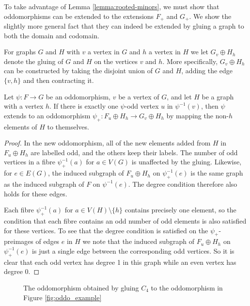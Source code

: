 \documentclass[11pt]{article}
\begin{document}
To take advantage of Lemma \ref{lemma:rooted-minors}, we must show that oddomorphisms can be extended to the extensions $F_+$ and $G_+$.
We show the slightly more general fact that they can indeed be extended by gluing a graph to both the domain and codomain.\par 
For graphs $G$ and $H$ with $v$ a vertex in $G$ and $h$ a vertex in $H$ we let $G_v \oplus H_h$ denote the gluing of $G$ and $H$ on the vertices $v$ and $h$. More specifically, $G_v \oplus H_h$ can be constructed by taking the disjoint union of $G$ and $H$, adding the edge $\{v,h\}$ and then contracting it.

\begin{lemma}
\label{lemma:oddo_extension}
    Let $\psi: F \to G$ be an oddomorphism, $v$ be a vertex of $G$, and let $H$ be a graph with a vertex $h$. If there is exactly one $\psi$-odd vertex $u$ in $\psi^{-1}(v)$, then $\psi$ extends to an oddomorphism $\psi_+:F_u \oplus H_h \to G_v \oplus H_h$ by mapping the non-$h$ elements of $H$ to themselves.
\end{lemma}
\begin{proof}
    In the new oddomorphism, all of the new elements added from $H$ in $F_u \oplus H_h$ are labelled odd, and the others keep their labels. 
    The number of odd vertices in a fibre $\psi_+^{-1}(a)$ for $a \in V(G)$ is unaffected by the gluing. Likewise, for $e \in E(G)$, the induced subgraph of $F_u \oplus H_h$ on $\psi_+^{-1}(e)$ is the same graph as the induced subgraph of $F$ on $\psi^{-1}(e)$. The degree condition therefore also holds for these edges.
\par 
    Each fibre $\psi_+^{-1}(a)$ for $a \in V(H) \setminus \{h\}$ contains precisely one element, so the condition that each fibre contains an odd number of odd elements is also satisfied for these vertices. To see that the degree condition is satisfied on the $\psi_+$-preimages of edges $e$ in $H$ we note that the induced subgraph of $F_u \oplus H_h$ on $\psi_+^{-1}(e)$ is just a single edge between the corresponding odd vertices. So it is clear that each odd vertex has degree 1 in this graph while an even vertex has degree 0.
\end{proof}

\begin{figure}[ht]
    \centering
    
    \caption{The oddomorphism obtained by gluing $C_4$ to the oddomorphism in Figure \ref{fig:oddo_example}}
    \label{fig:oddo_glued_example}
\end{figure}
\end{document}
